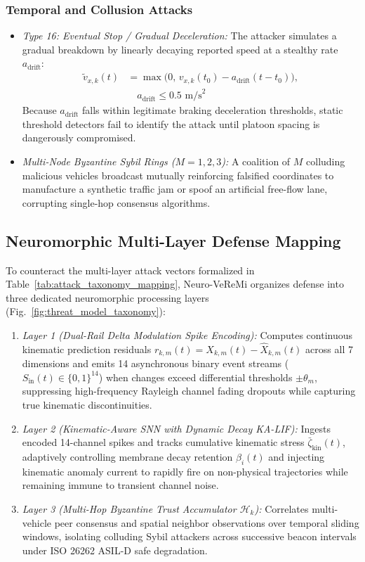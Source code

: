 \documentclass[journal]{IEEEtran}
\begin{document}
\subsubsection{Temporal and Collusion Attacks}
\begin{itemize}
    \item \textit{Type 16: Eventual Stop / Gradual Deceleration:} The attacker simulates a gradual breakdown by linearly decaying reported speed at a stealthy rate $a_{\text{drift}}$:
    \begin{equation}
    \begin{split}
        \tilde{v}_{x,k}(t) &= \max \big( 0,\, v_{x,k}(t_0) - a_{\text{drift}} (t - t_0) \big), \\
        &\quad a_{\text{drift}} \le 0.5\text{ m/s}^2
    \end{split}
    \end{equation}
    Because $a_{\text{drift}}$ falls within legitimate braking deceleration thresholds, static threshold detectors fail to identify the attack until platoon spacing is dangerously compromised.
    \item \textit{Multi-Node Byzantine Sybil Rings ($M=1, 2, 3$):} A coalition of $M$ colluding malicious vehicles broadcast mutually reinforcing falsified coordinates to manufacture a synthetic traffic jam or spoof an artificial free-flow lane, corrupting single-hop consensus algorithms.
\end{itemize}

\subsection{Neuromorphic Multi-Layer Defense Mapping}
To counteract the multi-layer attack vectors formalized in Table~\ref{tab:attack_taxonomy_mapping}, Neuro-VeReMi organizes defense into three dedicated neuromorphic processing layers (Fig.~\ref{fig:threat_model_taxonomy}):
\begin{enumerate}
    \item \textit{Layer 1 (Dual-Rail Delta Modulation Spike Encoding):} Computes continuous kinematic prediction residuals $r_{k,m}(t) = X_{k,m}(t) - \hat{X}_{k,m}(t)$ across all 7 dimensions and emits 14 asynchronous binary event streams ($S_{\text{in}}(t) \in \{0, 1\}^{14}$) when changes exceed differential thresholds $\pm\theta_m$, suppressing high-frequency Rayleigh channel fading dropouts while capturing true kinematic discontinuities.
    \item \textit{Layer 2 (Kinematic-Aware SNN with Dynamic Decay KA-LIF):} Ingests encoded 14-channel spikes and tracks cumulative kinematic stress $\bar{\zeta}_{\text{kin}}(t)$, adaptively controlling membrane decay retention $\beta_i(t)$ and injecting kinematic anomaly current to rapidly fire on non-physical trajectories while remaining immune to transient channel noise.
    \item \textit{Layer 3 (Multi-Hop Byzantine Trust Accumulator $\mathcal{H}_k$):} Correlates multi-vehicle peer consensus and spatial neighbor observations over temporal sliding windows, isolating colluding Sybil attackers across successive beacon intervals under ISO 26262 ASIL-D safe degradation.
\end{enumerate}
\end{document}
